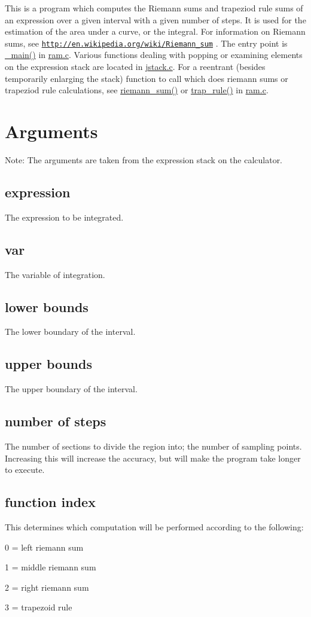 This is a program which computes the Riemann sums and trapeziod rule sums of an expression over a given interval with a given number of steps. It is used for the estimation of the area under a curve, or the integral. For information on Riemann sums, see \href{http://en.wikipedia.org/wiki/Riemann_sum}{\tt http://en.wikipedia.org/wiki/Riemann\_\-sum} . The entry point is \hyperlink{ram_8c_a212f497d0e60a46a30582320c2fefef}{\_\-main()} in \hyperlink{ram_8c}{ram.c}. Various functions dealing with popping or examining elements on the expression stack are located in \hyperlink{jstack_8c}{jstack.c}. For a reentrant (besides temporarily enlarging the stack) function to call which does riemann sums or trapeziod rule calculations, see \hyperlink{ram_8c_549bc93c3536bde8ffbcca9bb5035fda}{riemann\_\-sum()} or \hyperlink{ram_8c_0415ba140e87ce3dca1acc1017f36fc7}{trap\_\-rule()} in \hyperlink{ram_8c}{ram.c}. \hypertarget{index_Arguments}{}\section{Arguments}\label{index_Arguments}
Note: The arguments are taken from the expression stack on the calculator. \hypertarget{index_expression}{}\subsection{expression}\label{index_expression}
The expression to be integrated. \hypertarget{index_var}{}\subsection{var}\label{index_var}
The variable of integration. \hypertarget{index_lower_bounds}{}\subsection{lower bounds}\label{index_lower_bounds}
The lower boundary of the interval. \hypertarget{index_upper_bounds}{}\subsection{upper bounds}\label{index_upper_bounds}
The upper boundary of the interval. \hypertarget{index_number_of_steps}{}\subsection{number of steps}\label{index_number_of_steps}
The number of sections to divide the region into; the number of sampling points. Increasing this will increase the accuracy, but will make the program take longer to execute. \hypertarget{index_function_index}{}\subsection{function index}\label{index_function_index}
This determines which computation will be performed according to the following: \par
 0 = left riemann sum \par
 1 = middle riemann sum \par
 2 = right riemann sum \par
 3 = trapezoid rule 